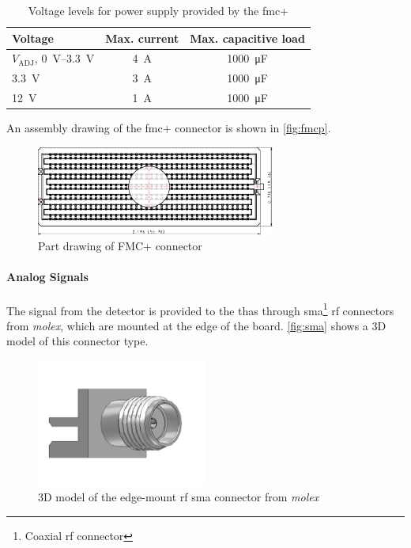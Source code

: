 \begin{table}[tbh]
	\caption[FMC+ Voltages]{Voltage levels for power supply provided by the \gls{fmc}+}
	\label{tab:fmc_ps}
		\centering
		\begin{tabularx}{\textwidth}{Xcc}
			\toprule
			\textbf{Voltage} & \textbf{Max. current} & \textbf{Max. capacitive load}\\
			\midrule
			$V_\text{ADJ}$, \SIrange{0}{3.3}{\volt} & \SI{4}{\ampere} & \SI{1000}{\micro \farad}\\
			\SI{3.3}{\volt} & \SI{3}{\ampere} & \SI{1000}{\micro \farad}\\
			\SI{12}{\volt} & \SI{1}{\ampere} & \SI{1000}{\micro \farad}\\
			\bottomrule
		\end{tabularx}
\end{table}

An assembly drawing of the \gls{fmc}+ connector is shown in \autoref{fig:fmcp}.

\begin{figure}[tbh]
	\centering
	\includegraphics[width = 0.7\textwidth]{chap/04-work/img/fmcp.pdf}
	\caption[Rendering of FMC+ connector]{Part drawing of FMC+ connector \cite{fmcpic}}
	\label{fig:fmcp}
\end{figure}

\paragraph{Analog Signals}
The signal from the detector is provided to the \glspl{tha} through \gls{sma}\footnote{Coaxial \gls{rf} connector} \gls{rf} connectors from \textit{molex}, which are mounted at the edge of the board.
\autoref{fig:sma} shows a 3D model of this connector type. 

\begin{figure}[tbh]
	\centering
	\includegraphics[width = 0.5\textwidth]{chap/04-work/img/sma}
	\caption[Edge-Mount RF SMA connector]{3D model of the edge-mount \gls{rf} \gls{sma} connector from \textit{molex} \cite{molex}}
	\label{fig:sma}
\end{figure}

